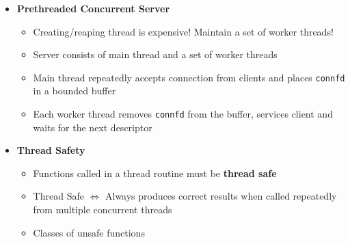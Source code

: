 \documentclass[12pt]{article}
\begin{document}
{\begin{itemize}
\begin{itemize}
				\item Writer threads modify the object $\rightarrow$ Must have exclusive access
				\item Unlimited readers can access the object
				\item \textit{First readers-writers problem} (Reader Favoring)
				\begin{itemize}
					\item No reader should be kept waiting if writer doesn't have access
					\item Reader has priority over writers
					\item Starvation for writers may happen
				\end{itemize} 
				\item \textit{Second readers-writers problem} (Writer Favoring)
				\begin{itemize}
					\item Once a writer is ready to write, performs write ASAP
					\item Readers that arrive after a writer must wait, even if the writer is also waiting
					\item Starvation for readers may happen
				\end{itemize}
			\end{itemize}
			\item \textbf{Prethreaded Concurrent Server}
			\begin{itemize}
				\item Creating/reaping thread is expensive! Maintain a set of worker threads!
				\item Server consists of main thread and a set of worker threads
				\item Main thread repeatedly accepts connection from clients and places \texttt{connfd} in a bounded buffer
				\item Each worker thread removes \texttt{connfd} from the buffer, services client and waits for the next descriptor
			\end{itemize}
			\item \textbf{Thread Safety}
			\begin{itemize}
				\item Functions called in a thread routine must be \textbf{thread safe}
				\item Thread Safe $\iff$ Always produces correct results when called repeatedly from multiple concurrent threads
				\item Classes of unsafe functions
				\begin{enumerate}

\end{enumerate}
\end{itemize}
\end{itemize}}
\end{document}
